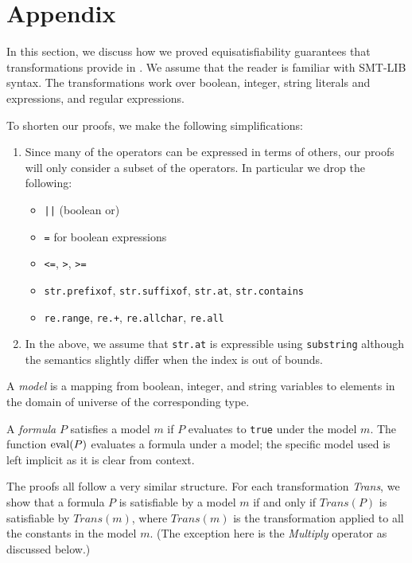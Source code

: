 \section{Appendix}

In this section, we discuss how we proved equisatisfiability
guarantees that transformations provide in \fuzzer{}. We assume that
the reader is familiar with SMT-LIB syntax. The transformations work
over boolean, integer, string literals and expressions, and regular
expressions.

To shorten our proofs, we make the following simplifications:
\begin{enumerate}
  \item
    Since many of the operators can be expressed in terms of others,
    our proofs will only consider a subset of the operators. In
    particular we drop the following:
    \begin{itemize}
      \item \texttt{||} (boolean or)
      \item \texttt{=} for boolean expressions
      \item \texttt{<=}, \texttt{>}, \texttt{>=}
      \item \texttt{str.prefixof}, \texttt{str.suffixof}, \texttt{str.at}, \texttt{str.contains}
      \item \texttt{re.range}, \texttt{re.+}, \texttt{re.allchar}, \texttt{re.all}
    \end{itemize}

  \item
    In the above, we assume that \texttt{str.at} is expressible using
    \texttt{substring} although the semantics slightly differ when the index is
    out of bounds.
\end{enumerate}

\begin{definition}
  A \emph{model} is a mapping from boolean, integer, and string variables to
elements in the domain of universe of the corresponding type.
\end{definition}

\begin{definition}
  A \emph{formula} $P$ satisfies a model $m$ if $P$ evaluates to
  \texttt{true} under the model $m$. The function $\operatorname{eval} (P)$
  evaluates a formula under a model; the specific model used is left
  implicit as it is clear from context.
\end{definition}

The proofs all follow a very similar structure. For each
transformation \textit{Trans}, we show that a formula $P$ is
satisfiable by a model $m$ if and only if $\textit{Trans}(P)$ is
satisfiable by $\textit{Trans}(m)$, where $\textit{Trans}(m)$ is the
transformation applied to all the constants in the model $m$. (The
exception here is the \textit{Multiply} operator as discussed below.)

